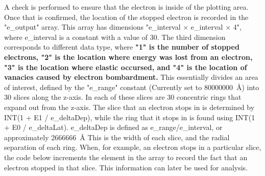 \documentclass[10pt, reqno]{exam}
\begin{document}
A check is performed to ensure that the electron is inside of the plotting area. Once that is confirmed, the location of the stopped electron is recorded in the "e\_output" array. This array has dimensions "e\_interval $\times$ e\_interval $\times$ 4", where e\_interval is a constant with a value of 30. The third dimension corresponds to different data type, where \textbf{"1" is the number of stopped electrons, "2" is the location where energy was lost from an electron, "3" is the location where elastic occursed, and "4" is the location of vanacies caused by electron bombardment.} This essentially divides an area of interest, defined by the "e\_range" constant (Currently set to \SI{80000000}{\angstrom}) into 30 slices along the z-axis. In each of these slices are 30 concentric rings that expand out from the z-axis. The slice that an electron stops in is determined by INT(1 + E1 / e\_deltaDep), while the ring that it stops in is found using INT(1 + E0 / e\_deltaLat). e\_deltaDep is defined as e\_range/e\_interval, or approximately \SI{2666666}{\angstrom} This is the width of each slice, and the radial separation of each ring. When, for example, an electron stops in a particular slice, the code below increments the element in the array to record the fact that an electron stopped in that slice. This information can later be used for analysis. \par
\end{document}
